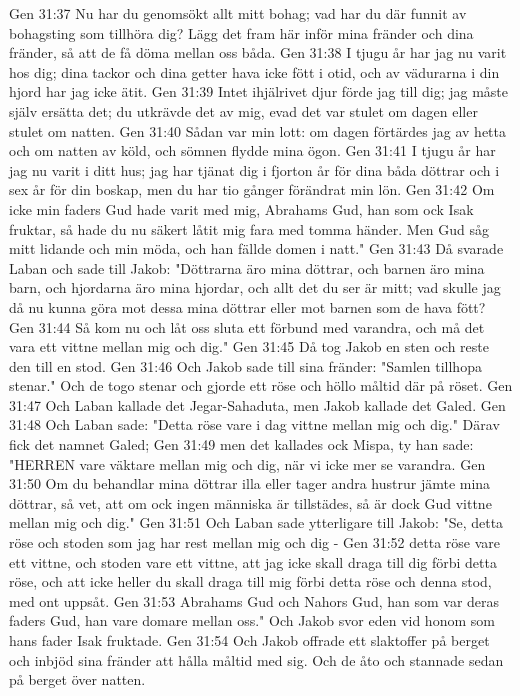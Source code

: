 Gen 31:37  Nu har du genomsökt allt mitt bohag; vad har du där funnit av bohagsting som tillhöra dig? Lägg det fram här inför mina fränder och dina fränder, så att de få döma mellan oss båda.
Gen 31:38  I tjugu år har jag nu varit hos dig; dina tackor och dina getter hava icke fött i otid, och av vädurarna i din hjord har jag icke ätit.
Gen 31:39  Intet ihjälrivet djur förde jag till dig; jag måste själv ersätta det; du utkrävde det av mig, evad det var stulet om dagen eller stulet om natten.
Gen 31:40  Sådan var min lott: om dagen förtärdes jag av hetta och om natten av köld, och sömnen flydde mina ögon.
Gen 31:41  I tjugu år har jag nu varit i ditt hus; jag har tjänat dig i fjorton år för dina båda döttrar och i sex år för din boskap, men du har tio gånger förändrat min lön.
Gen 31:42  Om icke min faders Gud hade varit med mig, Abrahams Gud, han som ock Isak fruktar, så hade du nu säkert låtit mig fara med tomma händer. Men Gud såg mitt lidande och min möda, och han fällde domen i natt."
Gen 31:43  Då svarade Laban och sade till Jakob: "Döttrarna äro mina döttrar, och barnen äro mina barn, och hjordarna äro mina hjordar, och allt det du ser är mitt; vad skulle jag då nu kunna göra mot dessa mina döttrar eller mot barnen som de hava fött?
Gen 31:44  Så kom nu och låt oss sluta ett förbund med varandra, och må det vara ett vittne mellan mig och dig."
Gen 31:45  Då tog Jakob en sten och reste den till en stod.
Gen 31:46  Och Jakob sade till sina fränder: "Samlen tillhopa stenar." Och de togo stenar och gjorde ett röse och höllo måltid där på röset.
Gen 31:47  Och Laban kallade det Jegar-Sahaduta, men Jakob kallade det Galed.
Gen 31:48  Och Laban sade: "Detta röse vare i dag vittne mellan mig och dig." Därav fick det namnet Galed;
Gen 31:49  men det kallades ock Mispa, ty han sade: "HERREN vare väktare mellan mig och dig, när vi icke mer se varandra.
Gen 31:50  Om du behandlar mina döttrar illa eller tager andra hustrur jämte mina döttrar, så vet, att om ock ingen människa är tillstädes, så är dock Gud vittne mellan mig och dig."
Gen 31:51  Och Laban sade ytterligare till Jakob: "Se, detta röse och stoden som jag har rest mellan mig och dig -
Gen 31:52  detta röse vare ett vittne, och stoden vare ett vittne, att jag icke skall draga till dig förbi detta röse, och att icke heller du skall draga till mig förbi detta röse och denna stod, med ont uppsåt.
Gen 31:53  Abrahams Gud och Nahors Gud, han som var deras faders Gud, han vare domare mellan oss." Och Jakob svor eden vid honom som hans fader Isak fruktade.
Gen 31:54  Och Jakob offrade ett slaktoffer på berget och inbjöd sina fränder att hålla måltid med sig. Och de åto och stannade sedan på berget över natten.
